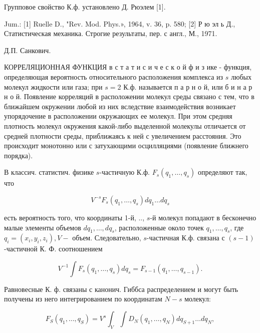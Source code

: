 \documentclass[10pt]{article}
\begin{document}
Групповое свойство К.ф. установлено Д. Рюэлем [1].



Jum.: [1] Ruelle D., "Rev. Mod. Phys.», 1964, v. 36, p. 580; [2] Р ю эл ь Д., Статистическая механика. Строгие результаты, пер. с англ., М., 1971.



Д.П. Санкович.



КОРРЕЛЯЦИОННАЯ ФУНКЦИЯ в с т а т и с и ч е с к о й ф и з ике - функция, определяющая вероятность относительного расположения комплекса из $s$ любых молекул жидкости или газа; при $s=2$ К.ф. называется п а р н о й, или б и н а р н о й. Появление корреляций в расположении молекул среды связано с тем, что в ближайшем окружении любой из них вследствие взаимодействия возникает упорядочение в расположении окружающих ее молекул. При этом средняя плотность молекул окружения какой-либо выделенной молекулы отличается от средней плотности среды, приближаясь к ней с увеличением расстояния. Это происходит монотонно или с затухающими осцилляциями (появление ближнего порядка).



В классич. статистич. физике $s$-частичную К.ф. $F_{s}\left(q_{1}, \ldots, q_{s}\right)$ определяют так, что



\[

V^{-s} F_{s}\left(q_{1}, \ldots, q_{s}\right) d q_{1} \ldots d q_{s}

\]



есть вероятность того, что координаты 1-й, .., $s$-й молекул попадают в бесконечно малые элементы объемов $d q_{1}, \ldots, d q_{s}$, расположенные около точек $q_{1}, \ldots, q_{s}$, где $q_{i}=\left(x_{i}, y_{i}, z_{i}\right), V-$ объем. Следовательно, $s$-частичная К.ф. связана с $(s-1)$-частичной К. Ф. соотношением



\[

V^{-1} \int F_{s}\left(q_{1}, \ldots, q_{s}\right) d q_{s}=F_{s-1}\left(q_{1}, \ldots, q_{s-1}\right) .

\]



Равновесные К. ф. связаны с канонич. Гиббса распределением и могут быть получены из него интегрированием по координатам $N-s$ молекул:



\[

F_{S}\left(q_{1}, \ldots, q_{S}\right)=V^{s} \int_{V} \int D_{N}\left(q_{1}, \ldots, q_{N}\right) d q_{S+1} \ldots d q_{N},

\]
\end{document}
